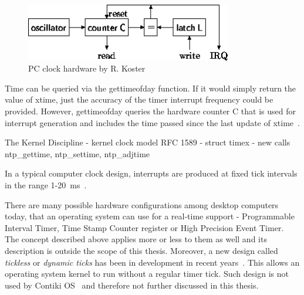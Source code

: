 \begin{figure}
  \centering
  \includegraphics[width=9cm,keepaspectratio]{fig/pc-clock.png}
  \caption{PC clock hardware by R. Koster}
  \label{fig:system-pc-clock}
\end{figure}

Time can be queried via the gettimeofday function.
If it would simply return the value of xtime,
just the accuracy of the timer interrupt frequency could be provided.
However, gettimeofday queries the hardware counter C that is used for
interrupt generation and includes the time passed since
the last update of xtime~\cite{thesis-beat}.





The Kernel Discipline -  kernel clock model RFC 1589 -
struct timex -
new calls ntp_gettime, ntp_settime, ntp_adjtime


In a typical computer clock design, interrupts are produced at
fixed tick intervals in the range 1-20~ms~\cite{nanokernel}.

There are many possible hardware configurations among desktop computers today,
that an operating system can use for a real-time support -
Programmable Interval Timer,
Time Stamp Counter register or High Precision Event Timer.
The concept described above applies more or less to them as well
and its description is outside the scope of this thesis.
Moreover, a new design called {\it{tickless}} or {\it{dynamic ticks}}
has been in development in recent years~\cite{kernel-timer-systems}.
This allows an operating system kernel to run without a regular timer tick.
Such design is not used by Contiki OS~\cite{contiki-docs} and
therefore not further discussed in this thesis.

